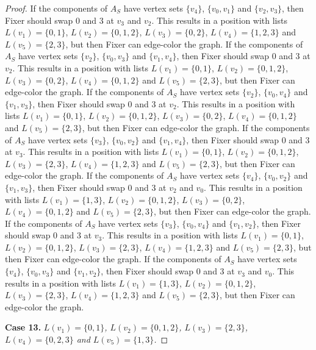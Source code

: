 \documentclass[12pt]{amsart}
\theoremstyle{plain}
\theoremstyle{definition}
\theoremstyle{remark}
\begin{document}
\begin{proof}
If the components of $A_S$ have vertex sets $\{v_4\}$, $\{v_0, v_1\}$ and $\{v_2, v_3\}$, then Fixer should swap 0 and 3 at $v_3$ and $v_2$. This results in a position with lists $L(v_1) = \{0, 1\}$, $L(v_2) = \{0, 1, 2\}$, $L(v_3) = \{0, 2\}$, $L(v_4) = \{1, 2, 3\}$ and $L(v_5) = \{2, 3\}$, but then Fixer can edge-color the graph.
If the components of $A_S$ have vertex sets $\{v_2\}$, $\{v_0, v_3\}$ and $\{v_1, v_4\}$, then Fixer should swap 0 and 3 at $v_2$. This results in a position with lists $L(v_1) = \{0, 1\}$, $L(v_2) = \{0, 1, 2\}$, $L(v_3) = \{0, 2\}$, $L(v_4) = \{0, 1, 2\}$ and $L(v_5) = \{2, 3\}$, but then Fixer can edge-color the graph.
If the components of $A_S$ have vertex sets $\{v_2\}$, $\{v_0, v_4\}$ and $\{v_1, v_3\}$, then Fixer should swap 0 and 3 at $v_2$. This results in a position with lists $L(v_1) = \{0, 1\}$, $L(v_2) = \{0, 1, 2\}$, $L(v_3) = \{0, 2\}$, $L(v_4) = \{0, 1, 2\}$ and $L(v_5) = \{2, 3\}$, but then Fixer can edge-color the graph.
If the components of $A_S$ have vertex sets $\{v_3\}$, $\{v_0, v_2\}$ and $\{v_1, v_4\}$, then Fixer should swap 0 and 3 at $v_3$. This results in a position with lists $L(v_1) = \{0, 1\}$, $L(v_2) = \{0, 1, 2\}$, $L(v_3) = \{2, 3\}$, $L(v_4) = \{1, 2, 3\}$ and $L(v_5) = \{2, 3\}$, but then Fixer can edge-color the graph.
If the components of $A_S$ have vertex sets $\{v_4\}$, $\{v_0, v_2\}$ and $\{v_1, v_3\}$, then Fixer should swap 0 and 3 at $v_2$ and $v_0$. This results in a position with lists $L(v_1) = \{1, 3\}$, $L(v_2) = \{0, 1, 2\}$, $L(v_3) = \{0, 2\}$, $L(v_4) = \{0, 1, 2\}$ and $L(v_5) = \{2, 3\}$, but then Fixer can edge-color the graph.
If the components of $A_S$ have vertex sets $\{v_3\}$, $\{v_0, v_4\}$ and $\{v_1, v_2\}$, then Fixer should swap 0 and 3 at $v_3$. This results in a position with lists $L(v_1) = \{0, 1\}$, $L(v_2) = \{0, 1, 2\}$, $L(v_3) = \{2, 3\}$, $L(v_4) = \{1, 2, 3\}$ and $L(v_5) = \{2, 3\}$, but then Fixer can edge-color the graph.
If the components of $A_S$ have vertex sets $\{v_4\}$, $\{v_0, v_3\}$ and $\{v_1, v_2\}$, then Fixer should swap 0 and 3 at $v_3$ and $v_0$. This results in a position with lists $L(v_1) = \{1, 3\}$, $L(v_2) = \{0, 1, 2\}$, $L(v_3) = \{2, 3\}$, $L(v_4) = \{1, 2, 3\}$ and $L(v_5) = \{2, 3\}$, but then Fixer can edge-color the graph.

\noindent\textbf{Case 13.  }\textit{$L(v_1) = \{0, 1\}$, $L(v_2) = \{0, 1, 2\}$, $L(v_3) = \{2, 3\}$, $L(v_4) = \{0, 2, 3\}$ and $L(v_5) = \{1, 3\}$.}


\end{proof}
\end{document}
